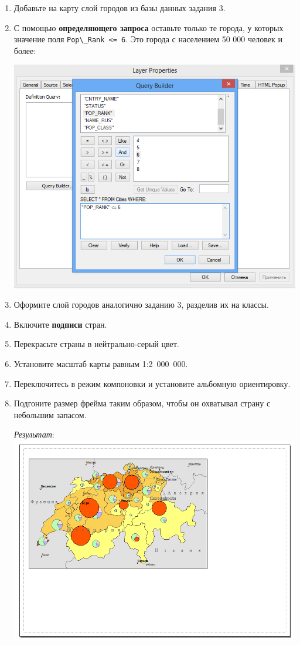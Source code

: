 \documentclass[12pt,]{book}
\begin{document}
\begin{enumerate}
\def\labelenumi{\arabic{enumi}.}
\item
  Добавьте на карту слой городов из базы данных задания 3.
\item
  С помощью \textbf{определяющего запроса} оставьте только те города, у которых значение поля \texttt{Pop\textbackslash{}\_Rank\ \textless{}=\ 6}. Это города с населением 50 000 человек и более:

  \includegraphics{images/Ex08/image31.png}
\item
  Оформите слой городов аналогично заданию 3, разделив их на классы.
\item
  Включите \textbf{подписи} стран.
\item
  Перекрасьте страны в нейтрально-серый цвет.
\item
  Установите масштаб карты равным 1:2~000~000.
\item
  Переключитесь в режим компоновки и установите альбомную ориентировку.
\item
  Подгоните размер фрейма таким образом, чтобы он охватывал страну с небольшим запасом.

  \emph{Результат}:
  \includegraphics{images/Ex08/image32.png}


\end{enumerate}
\end{document}
